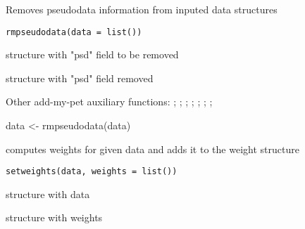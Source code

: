 \documentclass[a4paper]{book}
\begin{document}
%
\begin{Description}\relax
Removes pseudodata information from inputed data structures
\end{Description}
%
\begin{Usage}
\begin{verbatim}
rmpseudodata(data = list())
\end{verbatim}
\end{Usage}
%
\begin{Arguments}
\begin{ldescription}
\item[\code{data}] structure with "psd" field to be removed
\end{ldescription}
\end{Arguments}
%
\begin{Value}
structure with "psd" field removed
\end{Value}
%
\begin{SeeAlso}\relax
Other add-my-pet auxiliary functions: ;
; ;
; ;
; ;
\end{SeeAlso}
%
\begin{Examples}
\begin{ExampleCode}
data <- rmpseudodata(data)
\end{ExampleCode}
\end{Examples}
%
\begin{Description}\relax
computes weights for given data and adds it to the weight structure
\end{Description}
%
\begin{Usage}
\begin{verbatim}
setweights(data, weights = list())
\end{verbatim}
\end{Usage}
%
\begin{Arguments}
\begin{ldescription}
\item[\code{data}] structure with data

\item[\code{weights}] structure with weights
\end{ldescription}
\end{Arguments}
\end{document}
